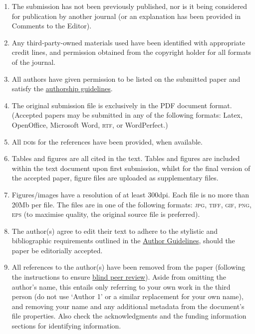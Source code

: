 \documentclass[]{glossa}
\begin{document}
\begin{enumerate}
\def\labelenumi{\arabic{enumi}.}
\item
  The submission has not been previously published, nor is it being
  considered for publication by another journal (or an explanation has
  been provided in Comments to the Editor).
\item
  Any third-party-owned materials used have been identified with
  appropriate credit lines, and permission obtained from the copyright
  holder for all formats of the journal.
\item
  All authors have given permission to be listed on the submitted paper
  and satisfy the
  \href{http://glossa.ubiquitypress.com/about/authorship/}{authorship
  guidelines}.
\item
  The original submission file is exclusively in the PDF document
  format. (Accepted papers may be submitted in any of the following
  formats: Latex, OpenOffice, Microsoft Word, \textsc{rtf}, or
  WordPerfect.)
\item
  All \textsc{doi}s for the references have been provided, when
  available.
\item
  Tables and figures are all cited in the text. Tables and figures are
  included within the text document upon first submission, whilst for
  the final version of the accepted paper, figure files are uploaded as
  supplementary files.
\item
  Figures/images have a resolution of at least 300dpi. Each file is no
  more than 20Mb per file. The files are in one of the following
  formats: \textsc{jpg, tiff, gif, png, eps} (to maximise quality, the
  original source file is preferred).
\item
  The author(s) agree to edit their text to adhere to the stylistic and
  bibliographic requirements outlined in the
  \href{https://www.glossa-journal.org/about/submissions\#authorGuidelines}{Author
  Guidelines}, should the paper be editorially accepted.
\item
  All references to the author(s) have been removed from the paper
  (following the instructions to ensure
  \href{https://www.glossa-journal.org/help/view/editorial/topic/000044}{blind
  peer review}). Aside from omitting the author's name, this entails
  only referring to your own work in the third person (do not use
  `Author 1' or a similar replacement for your own name), and removing
  your name and any additional metadata from the document's file
  properties. Also check the acknowledgments and the funding information
  sections for identifying information.
\end{enumerate}
\end{document}
